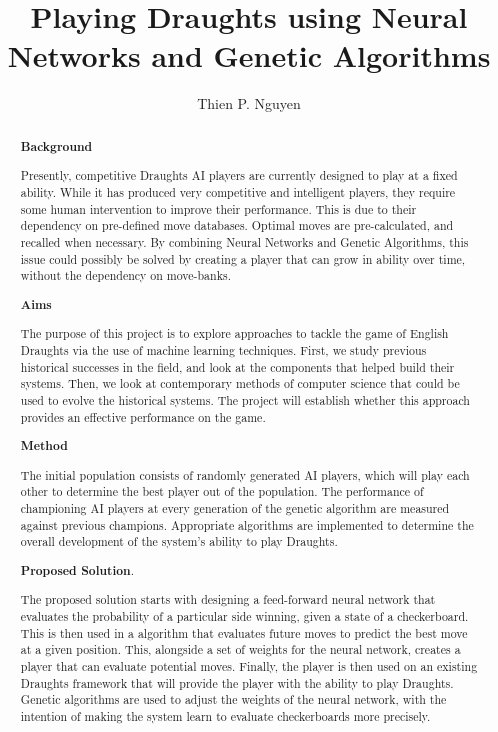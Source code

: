 \documentclass[12pt,a4paper]{article}
\title{Playing Draughts using Neural Networks and Genetic Algorithms}
\author{Thien P. Nguyen}
\begin{document}
\maketitle

\begin{abstract}

    {\bf Background}

    Presently, competitive Draughts AI players are currently designed to play at a fixed ability. While it has produced very competitive and intelligent players, they require some human intervention to improve their performance. 
    This is due to their dependency on pre-defined move databases. Optimal moves are pre-calculated, and recalled when necessary. By combining Neural Networks and Genetic Algorithms, this issue could possibly be solved by creating a player that can grow in ability over time, without the dependency on move-banks.
    
    {\bf Aims}

    The purpose of this project is to explore approaches to tackle the game of English Draughts via the use of machine learning techniques. First, we study previous historical successes in the field, and look at the components that helped build their systems. Then, we look at contemporary methods of computer science that could be used to evolve the historical systems. The project will establish whether this approach provides an effective performance on the game.
    
    {\bf Method}

    The initial population consists of randomly generated AI players, which will play each other to determine the best player out of the population. The performance of championing AI players at every generation of the genetic algorithm are measured against previous champions. Appropriate algorithms are implemented to determine the overall development of the system's ability to play Draughts.

    {\bf Proposed Solution}.  

    The proposed solution starts with designing a feed-forward neural network that evaluates the probability of a particular side winning, given a state of a checkerboard. This is then used in a algorithm that evaluates future moves to predict the best move at a given position. This, alongside a set of weights for the neural network, creates a player that can evaluate potential moves. Finally, the player is then used on an existing Draughts framework that will provide the player with the ability to play Draughts. Genetic algorithms are used to adjust the weights of the neural network, with the intention of making the system learn to evaluate checkerboards more precisely.

\end{abstract}
\end{document}

